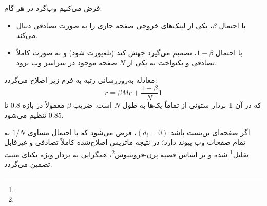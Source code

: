\begin{definition}
فرض می‌کنیم وب‌گرد در هر گام:
\begin{itemize}
    \item با احتمال $\beta$، یکی از لینک‌های خروجی صفحه جاری را به صورت تصادفی دنبال می‌کند.
    \item با احتمال $1 - \beta$، تصمیم می‌گیرد جهش کند (تله‌پورت شود) و به صورت کاملاً تصادفی و یکنواخت به یکی از $N$ صفحه موجود در سراسر وب برود.
\end{itemize}
معادله به‌روزرسانی رتبه به فرم زیر اصلاح می‌گردد:
\begin{equation}
r = \beta M r + \frac{1 - \beta}{N} \mathbf{1}
\end{equation}
که در آن $\mathbf{1}$ بردار ستونی از تماماً یک‌ها به طول $N$ است. ضریب $\beta$ معمولاً در بازه $0.8$ تا $0.85$ تنظیم می‌شود.
\end{definition}

اگر صفحه‌ای بن‌بست باشد $(d_i = 0)$، فرض می‌شود که با احتمال مساوی $1/N$ به تمام صفحات وب پیوند دارد؛ در نتیجه ماتریس اصلاح‌شده کاملاً تصادفی و غیرقابل تقلیل\footnote{} شده و بر اساس قضیه پرن-فروبنیوس\footnote{}، همگرایی به بردار ویژه یکتای مثبت تضمین می‌گردد.

